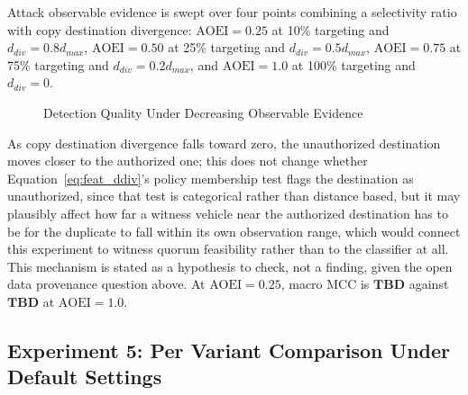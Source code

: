 \documentclass[final,5p,twocolumn]{elsarticle}
\theoremstyle{remark}
\theoremstyle{plain}
\newcommand{\TBD}{\textbf{TBD}} %
\begin{document}
Attack observable evidence is swept over four points combining a
selectivity ratio with copy destination divergence: $\text{AOEI}{=}0.25$ at
10\% targeting and $d_{div}{=}0.8 d_{max}$, $\text{AOEI}{=}0.50$ at 25\%
targeting and $d_{div}{=}0.5 d_{max}$, $\text{AOEI}{=}0.75$ at 75\%
targeting and $d_{div}{=}0.2 d_{max}$, and $\text{AOEI}{=}1.0$ at 100\%
targeting and $d_{div}{=}0$.
\begin{figure}[!t]
	\centering
	\caption{Detection Quality Under Decreasing Observable Evidence}
	\label{fig:exp4_aoei}
\end{figure}
As copy destination divergence falls toward zero, the unauthorized
destination moves closer to the authorized one; this does not change
whether Equation~\eqref{eq:feat_ddiv}'s policy membership test flags the
destination as unauthorized, since that test is categorical rather than
distance based, but it may plausibly affect how far a witness vehicle near
the authorized destination has to be for the duplicate to fall within its
own observation range, which would connect this experiment to witness
quorum feasibility rather than to the classifier at all. This mechanism is
stated as a hypothesis to check, not a finding, given the open data
provenance question above. At $\text{AOEI}{=}0.25$, macro MCC is $\TBD$
against $\TBD$ at $\text{AOEI}{=}1.0$.

\subsection{Experiment 5: Per Variant Comparison Under Default Settings}
\end{document}
